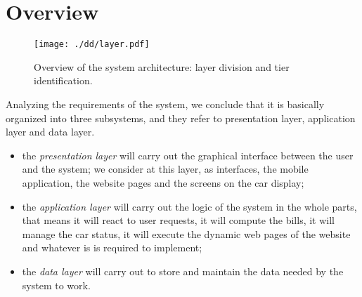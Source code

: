 \documentclass{scrreprt}
\begin{document}
\section{Overview}
\begin{figure}[h]
\centering
		\texttt{[image: ./dd/layer.pdf]}
		\caption{Overview of the system architecture: layer division and tier identification.}
		\label{layerTier}
\end{figure}
\begin{comment}
The system is multi-tier, in fact it is composed by:
\begin{itemize}
\item the main logic element as the \emph{Application server};
\item a restricted logic element placed on the cars as \emph{On-board system};
\item data are managed and stored in a dedicated server as \emph{Database server} (this component is in charge of the data layer);
\item a web-server is in charge to interact with the users who adopt the website solution and to interface with the application server;
\item presentation layer is assigned to the mobile app, which interfaces directly with the application server, to the \emph{on-board application} which interfaces directly with the \emph{on-board system} and to the web browser which interfaces directly with the web server.
\end{itemize}
\end{comment}
Analyzing the requirements of the system, we conclude that it is basically organized into three subsystems, and they refer to presentation layer, application layer and data layer.
\begin{itemize}
\item the \emph{presentation layer} will carry out the graphical interface between the user and the system; we consider at this layer, as interfaces, the mobile application, the website pages and the screens on the car display;
\item the \emph{application layer} will carry out the logic of the system in the whole parts, that means it will react to user requests, it will compute the bills, it will manage the car status, it will execute the dynamic web pages of the website and whatever is is required to implement;
\item the \emph{data layer} will carry out to store and maintain the data needed by the system to work.
\end{itemize}
\end{document}
